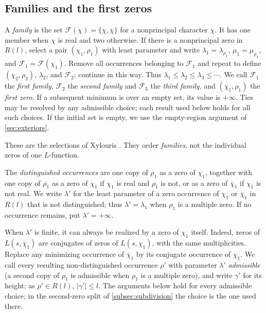 \documentclass[11pt]{amsart}
\numberwithin{equation}{section}
\theoremstyle{plain}
\theoremstyle{definition}
\theoremstyle{remark}
\newcommand{\1}{\mathbf{1}}
\newcommand{\bchi}{\overline{\chi}}
\begin{document}
\subsection{Families and the first zeros}
\begin{definition}\label{def:families}
A \emph{family} is the set $\mathcal F(\chi)=\{\chi,\bchi\}$ for a nonprincipal character
$\chi$. It has one member when $\chi$ is real and two otherwise.
If there is a nonprincipal zero in $R(l)$, select a pair $(\chi_1,\rho_1)$ with least
parameter and write $\lambda_1=\lambda_{\rho_1}$, $\mu_1=\mu_{\rho_1}$, and
$\mathcal F_1=\mathcal F(\chi_1)$. Remove all occurrences belonging to $\mathcal F_1$ and
repeat to define $(\chi_2,\rho_2)$, $\lambda_2$, and $\mathcal F_2$; continue in this way.
Thus $\lambda_1\le\lambda_2\le\lambda_3\le\cdots$. We call $\mathcal F_1$ the \emph{first family},
$\mathcal F_2$ the \emph{second family} and $\mathcal F_3$ the \emph{third family}, and $(\chi_1,\rho_1)$
the \emph{first zero}.
If a subsequent minimum is over an empty set, its value is $+\infty$.
Ties may be resolved by any admissible choice; each result used below holds for all such
choices. If the initial set is empty, we use the empty-region argument of
\cref{sec:exteriors}.
\end{definition}

These are the selections of Xylouris \cite[\S3.1.2]{Xylouris2011nullstellen}.
They order \emph{families}, not the individual zeros of one $L$-function.

\begin{definition}\label{def:additionalzero}
The \emph{distinguished occurrences} are one copy of $\rho_1$ as a zero of $\chi_1$, together with one
copy of $\overline{\rho_1}$ as a zero of $\chi_1$ if $\chi_1$ is real and $\rho_1$ is not, or as a zero of
$\bchi_1$ if $\chi_1$ is not real. We write $\lambda'$ for the least parameter of a zero occurrence of
$\chi_1$ or $\bchi_1$ in $R(l)$ that is not distinguished; thus $\lambda'=\lambda_1$ when $\rho_1$ is a
multiple zero. If no occurrence remains, put $\lambda'=+\infty$.
\end{definition}

When $\lambda'$ is finite, it can always be realized by a zero of $\chi_1$ itself.
Indeed, zeros of $L(s,\bchi_1)$ are conjugates of zeros of $L(s,\chi_1)$, with the same
multiplicities. Replace any minimizing occurrence of $\bchi_1$ by its conjugate
occurrence of $\chi_1$. We call every resulting non-distinguished occurrence $\rho'$
with parameter $\lambda'$ \emph{admissible} (a second copy of $\rho_1$ is admissible when
$\rho_1$ is a multiple zero), and
write $\gamma'$ for its height; as $\rho'\in R(l)$, $|\gamma'|\le l$. The arguments below hold for every admissible
choice; in the second-zero split of \cref{subsec:subdivision} the choice is the one used there.
\end{document}

